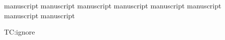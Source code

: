 \documentclass[11pt]{report}
\begin{document}
\newpage

\setlength\parskip{11pt}


{manuscript}
{manuscript}
{manuscript}
{manuscript}
{manuscript}
{manuscript}
{manuscript}
{manuscript}

TC:ignore
\newpage
\setlength\bibitemsep{5pt}
\printbibliography[heading=bibintoc, title={Bibliografía}]

\end{document}
